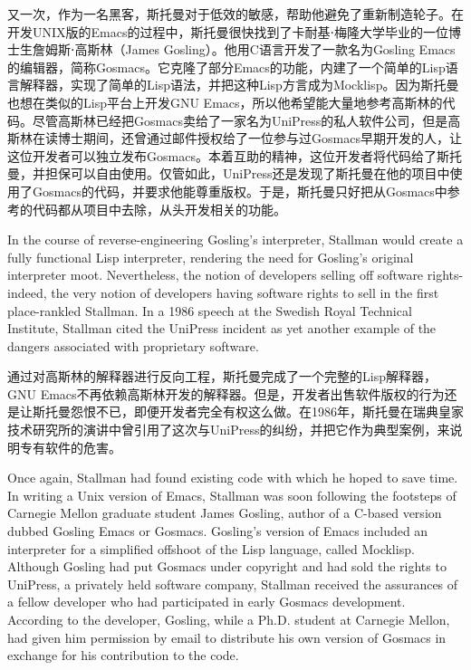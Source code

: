 \ifdefined\chs
又一次，作为一名黑客，斯托曼对于低效的敏感，帮助他避免了重新制造轮子。在开发UNIX版的Emacs的过程中，斯托曼很快找到了卡耐基⋅梅隆大学毕业的一位博士生詹姆斯⋅高斯林（James Gosling）。他用C语言开发了一款名为Gosling Emacs的编辑器，简称Gosmacs。它克隆了部分Emacs的功能，内建了一个简单的Lisp语言解释器，实现了简单的Lisp语法，并把这种Lisp方言成为Mocklisp。因为斯托曼也想在类似的Lisp平台上开发GNU Emacs，所以他希望能大量地参考高斯林的代码。尽管高斯林已经把Gosmacs卖给了一家名为UniPress的私人软件公司，但是高斯林在读博士期间，还曾通过邮件授权给了一位参与过Gosmacs早期开发的人，让这位开发者可以独立发布Gosmacs。本着互助的精神，这位开发者将代码给了斯托曼，并担保可以自由使用。仅管如此，UniPress还是发现了斯托曼在他的项目中使用了Gosmacs的代码，并要求他能尊重版权。于是，斯托曼只好把从Gosmacs中参考的代码都从项目中去除，从头开发相关的功能。
\fi

\ifdefined\eng
In the course of reverse-engineering Gosling's interpreter, Stallman would create a fully functional Lisp interpreter, rendering the need for Gosling's original interpreter moot. Nevertheless, the notion of developers selling off software rights-indeed, the very notion of developers having software rights to sell in the first place-rankled Stallman. In a 1986 speech at the Swedish Royal Technical Institute, Stallman cited the UniPress incident as yet another example of the dangers associated with proprietary software.
\fi

\ifdefined\chs
通过对高斯林的解释器进行反向工程，斯托曼完成了一个完整的Lisp解释器，GNU Emacs不再依赖高斯林开发的解释器。但是，开发者出售软件版权的行为还是让斯托曼怨恨不已，即便开发者完全有权这么做。在1986年，斯托曼在瑞典皇家技术研究所的演讲中曾引用了这次与UniPress的纠纷，并把它作为典型案例，来说明专有软件的危害。
\fi

\fi
\ifdefined\vtwo
\ifdefined\eng
Once again, Stallman had found existing code with which he hoped to save time. In writing a Unix version of Emacs, Stallman was soon following the footsteps of Carnegie Mellon graduate student James Gosling, author of a C-based version dubbed Gosling Emacs or Gosmacs. Gosling's version of Emacs included an interpreter for a simplified offshoot of the Lisp language, called Mocklisp. Although Gosling had put Gosmacs under copyright and had sold the rights to UniPress, a privately held software company, Stallman received the assurances of a fellow developer who had participated in early Gosmacs development. According to the developer, Gosling, while a Ph.D. student at Carnegie Mellon, had given him permission by email to distribute his own version of Gosmacs in exchange for his contribution to the code.
\fi

